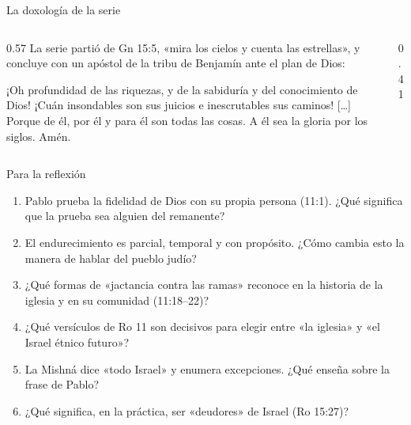 \begin{frame}{La doxología de la serie}
\begin{columns}[c,onlytextwidth]
\begin{column}{0.57\textwidth}
\small La serie partió de Gn 15:5, «mira los cielos y cuenta las estrellas», y concluye con un apóstol de la tribu de Benjamín ante el plan de Dios:
\begin{cita}¡Oh profundidad de las riquezas, y de la sabiduría y del conocimiento de Dios! ¡Cuán insondables son sus juicios e inescrutables sus caminos! [\ldots] Porque de él, por él y para él son todas las cosas. A él sea la gloria por los siglos. Amén.\end{cita}
\end{column}
\begin{column}{0.41\textwidth}\end{column}
\end{columns}
\end{frame}

\begin{frame}{Para la reflexión}
\small
\begin{enumerate}
\item Pablo prueba la fidelidad de Dios con su propia persona (11:1). ¿Qué significa que la prueba sea alguien del remanente?
\item El endurecimiento es parcial, temporal y con propósito. ¿Cómo cambia esto la manera de hablar del pueblo judío?
\item ¿Qué formas de «jactancia contra las ramas» reconoce en la historia de la iglesia y en su comunidad (11:18--22)?
\item ¿Qué versículos de Ro 11 son decisivos para elegir entre «la iglesia» y «el Israel étnico futuro»?
\item La Mishná dice «todo Israel» y enumera excepciones. ¿Qué enseña sobre la frase de Pablo?
\item ¿Qué significa, en la práctica, ser «deudores» de Israel (Ro 15:27)?
\end{enumerate}
\end{frame}

